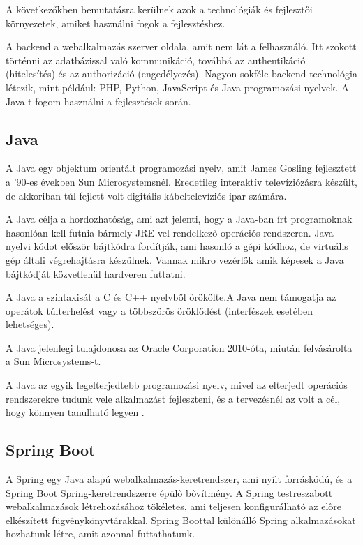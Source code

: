 
A következőkben bemutatásra kerülnek azok a technológiák és fejlesztői környezetek, amiket használni fogok a fejlesztéshez.


A backend a webalkalmazás szerver oldala, amit nem lát a felhasználó. Itt szokott történni az adatbázissal való kommunikáció, továbbá az authentikáció (hitelesítés) és az authorizáció (engedélyezés). Nagyon sokféle backend technológia létezik, mint például: PHP, Python, JavaScript és Java programozási nyelvek. A Java-t fogom használni a fejlesztések során.

\subsection{Java}

A Java \cite{Java} egy objektum orientált programozási nyelv, amit James Gosling fejlesztett a ’90-es években Sun Microsystemsnél. Eredetileg interaktív televíziózásra készült, de akkoriban túl fejlett volt digitális kábeltelevíziós ipar számára.

A Java célja a hordozhatóság, ami azt jelenti, hogy a Java-ban írt programoknak hasonlóan kell futnia bármely JRE-vel rendelkező operációs rendszeren. Java nyelvi kódot először bájtkódra fordítják, ami hasonló a gépi kódhoz, de virtuális gép általi végrehajtásra készülnek. Vannak mikro vezérlők amik képesek a Java bájtkódját közvetlenül hardveren futtatni.

A Java a szintaxisát a C és C++ nyelvből örökölte.A Java nem támogatja az operátok túlterhelést vagy a többszörös öröklődést (interfészek esetében lehetséges).

A Java jelenlegi tulajdonosa az Oracle Corporation 2010-óta, miután felvásárolta a Sun Microsystems-t.

A Java az egyik legelterjedtebb programozási nyelv, mivel az elterjedt operációs rendszerekre tudunk vele alkalmazást fejleszteni, és a tervezésnél az volt a cél, hogy könnyen tanulható legyen .

\subsection{Spring Boot}

A Spring egy Java alapú webalkalmazás-keretrendszer, ami nyílt forráskódú, és a Spring Boot Spring-keretrendszerre épülő bővítmény. A Spring testreszabott webalkalmazások létrehozásához tökéletes, ami teljesen konfigurálható az előre elkészített fügvénykönyvtárakkal. Spring Boottal különálló Spring alkalmazásokat hozhatunk létre, amit azonnal futtathatunk.


